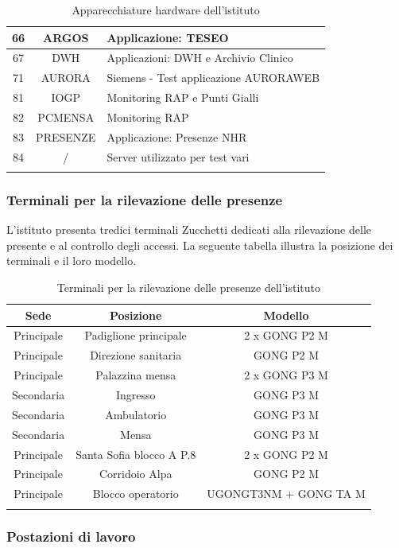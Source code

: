 \documentclass[12pt, a4paper, titlepage]{report}
\begin{document}
\begin{longtable}{| c | c | p{6cm} |}
				66 & ARGOS & Applicazione: TESEO \\ \hline
				67 & DWH & Applicazioni: DWH e Archivio Clinico \\ \hline
				71 & AURORA & Siemens - Test applicazione AURORAWEB \\ \hline
				81 & IOGP & Monitoring RAP e Punti Gialli \\ \hline
				82 & PCMENSA & Monitoring RAP \\ \hline
				83 & PRESENZE & Applicazione: Presenze NHR \\ \hline
				84 & / & Server utilizzato per test vari \\ \hline
				\caption{Apparecchiature hardware dell'istituto}
		\end{longtable}
		
		
		
		\subsubsection{Terminali per la rilevazione delle presenze}
		
		L'istituto presenta tredici terminali Zucchetti dedicati alla rilevazione delle presente e al controllo degli accessi. La seguente tabella illustra la posizione dei terminali e il loro modello.
		\newpage
		\begin{longtable}{| c | c | c |}
		\hline
		\textbf{Sede} & \textbf{Posizione} & \textbf{Modello}\\ \hline
		Principale & Padiglione principale & 2 x GONG P2 M \\ \hline
		Principale & Direzione sanitaria & GONG P2 M \\ \hline
		Principale & Palazzina mensa & 2 x GONG P3 M \\ \hline
		Secondaria & Ingresso & GONG P3 M \\ \hline
		Secondaria & Ambulatorio & GONG P3 M \\ \hline
		Secondaria & Mensa & GONG P3 M \\ \hline
		Principale & Santa Sofia blocco A P.8 & 2 x GONG P2 M \\ \hline
		Principale & Corridoio Alpa & GONG P2 M \\ \hline
		Principale & Blocco operatorio & UGONGT3NM + GONG TA M \\ \hline
		\caption{Terminali per la rilevazione delle presenze dell'istituto}
		\end{longtable}
		
		\subsubsection{Postazioni di lavoro}
	
\end{document}
